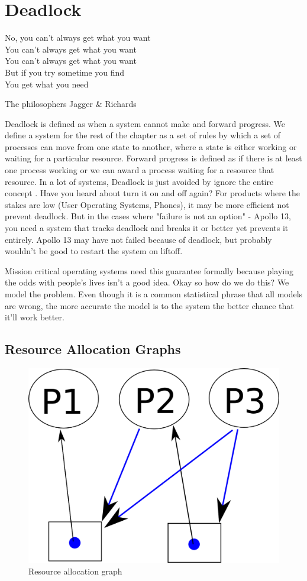 \chapter{Deadlock}

\epigraph{No, you can't always get what you want
\\You can't always get what you want
\\You can't always get what you want
\\But if you try sometime you find
\\You get what you need}{The philosophers Jagger \& Richards}

\gls{Deadlock} is defined as when a system cannot make and forward progress. We define a system for the rest of the chapter as a set of rules by which a set of processes can move from one state to another, where a state is either working or waiting for a particular resource. Forward progress is defined as if there is at least one process working or we can award a process waiting for a resource that resource. In a lot of systems, Deadlock is just avoided by ignore the entire concept \cite[P.237]{silberschatz2006operating}. Have you heard about turn it on and off again? For products where the stakes are low (User Operating Systems, Phones), it may be more efficient not prevent deadlock. But in the cases where "failure is not an option" - Apollo 13, you need a system that tracks deadlock and breaks it or better yet prevents it entirely. Apollo 13 may have not failed because of deadlock, but probably wouldn't be good to restart the system on liftoff.

Mission critical operating systems need this guarantee formally because playing the odds with people's lives isn't a good idea. Okay so how do we do this? We model the problem. Even though it is a common statistical phrase that all models are wrong, the more accurate the model is to the system the better chance that it'll work better.

\section{Resource Allocation Graphs}

\begin{figure}
  \begin{center}
\includegraphics[width=.25\textwidth]{deadlock/images/resource_allocation.png}
\end{center}
  \caption{Resource allocation graph}
  \label{ragfigure}
\end{figure}


